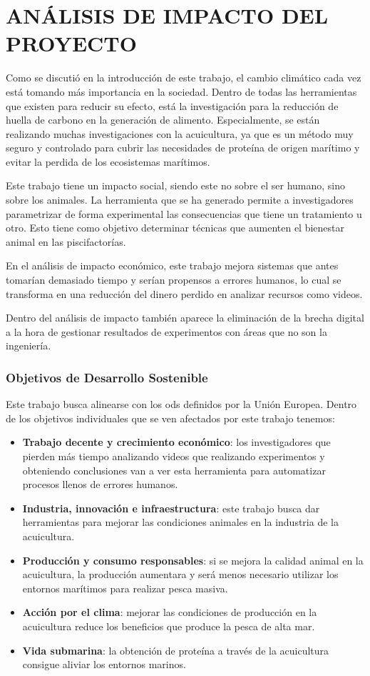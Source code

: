 \section{ANÁLISIS DE IMPACTO DEL PROYECTO}

Como se discutió en la introducción de este trabajo, el cambio climático cada vez está tomando más importancia en la sociedad. Dentro de todas las herramientas que existen para reducir su 
efecto, está la investigación para la reducción de huella de carbono en la generación de alimento. Especialmente, se están realizando muchas investigaciones con la acuicultura, ya que es un 
método muy seguro y controlado para cubrir las necesidades de proteína de origen marítimo y evitar la perdida de los ecosistemas marítimos.

Este trabajo tiene un impacto social, siendo este no sobre el ser humano, sino sobre los animales. La herramienta que se ha generado permite a investigadores parametrizar de forma experimental 
las consecuencias que tiene un tratamiento u otro. Esto tiene como objetivo determinar técnicas que aumenten el bienestar animal en las piscifactorías.

En el análisis de impacto económico, este trabajo mejora sistemas que antes tomarían demasiado tiempo y serían propensos a errores humanos, lo cual se transforma en una reducción del dinero 
perdido en analizar recursos como videos.

Dentro del análisis de impacto también aparece la eliminación de la brecha digital a la hora de gestionar resultados de experimentos con áreas que no son la ingeniería.

\subsubsection*{Objetivos de Desarrollo Sostenible}

Este trabajo busca alinearse con los \acrshort{ods} definidos por la Unión Europea. Dentro de los objetivos individuales que se ven afectados por este trabajo tenemos:
\begin{itemize}
    \item \textbf{Trabajo decente y crecimiento económico}: los investigadores que pierden más tiempo analizando videos que realizando experimentos y obteniendo conclusiones van a ver esta herramienta 
    para automatizar procesos llenos de errores humanos.
    \item \textbf{Industria, innovación e infraestructura}: este trabajo busca dar herramientas para mejorar las condiciones animales en la industria de la acuicultura.
    \item \textbf{Producción y consumo responsables}: si se mejora la calidad animal en la acuicultura, la producción aumentara y será menos necesario utilizar los entornos marítimos para realizar pesca 
    masiva.
    \item \textbf{Acción por el clima}: mejorar las condiciones de producción en la acuicultura reduce los beneficios que produce la pesca de alta mar.
    \item \textbf{Vida submarina}: la obtención de proteína a través de la acuicultura consigue aliviar los entornos marinos.
\end{itemize}